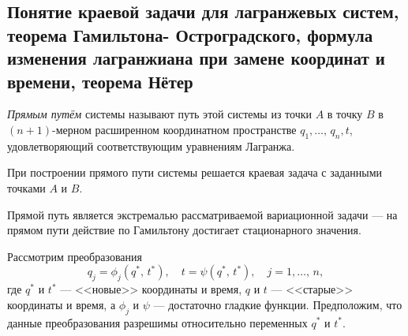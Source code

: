\documentclass[a4paper,12pt]{article}
\begin{document}
\subsection{Понятие краевой задачи для лагранжевых систем, теорема Гамильтона-
Остроградского, формула изменения лагранжиана при замене координат и
времени, теорема Нётер}
\begin{dfn}
	\emph{Прямым путём} системы называют путь этой системы из точки $A$ в
	точку  $B$ в $(n+1)$-мерном расширенном координатном пространстве
	$q_1,\ldots,\,q_n,t$, удовлетворяющий соответствующим уравнениям
	Лагранжа.
\end{dfn}
При построении прямого пути системы решается краевая задача с заданными точками
$A$ и  $B$.
\begin{thm}
	Прямой путь является экстремалью рассматриваемой вариационной задачи
	--- на прямом пути действие по Гамильтону достигает стационарного
	значения.
\end{thm}
Рассмотрим преобразования
\[
	q_j=\phi_j(q^*,\,t^*),\quad t=\psi(q^*,\,t^*), \quad j=1,\ldots,\,n,
\] 
где $q^*$ и $t^*$ ---  <<новые>> координаты и время, $q$ и $t$ --- <<старые>>
координаты и время, а $\phi_j$ и $\psi$ --- достаточно гладкие функции.
Предположим, что данные преобразования разрешимы относительно переменных
$q^*$ и  $t^*$.
\end{document}
